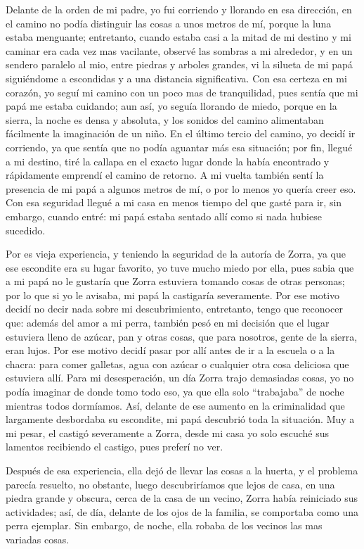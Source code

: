 Delante de la orden de mi padre, yo fui corriendo y llorando en esa dirección, en el camino no podía distinguir las cosas a unos metros de mí, porque la luna estaba menguante; entretanto, cuando estaba casi a la mitad de mi destino y mi caminar era cada vez mas vacilante, observé las sombras a mi alrededor, y en un sendero paralelo al mio, entre piedras y arboles grandes, vi la silueta de mi papá siguiéndome a escondidas y a una distancia significativa.
Con esa certeza en mi corazón, yo seguí mi camino con un poco mas de tranquilidad, pues sentía que mi papá me estaba cuidando; aun así, yo seguía llorando de miedo, porque en la sierra, la noche es densa y absoluta, y los sonidos del camino alimentaban fácilmente la imaginación de un niño.
En el último tercio del camino, yo decidí ir corriendo, ya que sentía que no podía aguantar más esa situación; por fin, llegué a mi destino, tiré la callapa en el exacto lugar donde la había encontrado y rápidamente emprendí el camino de retorno.
A mi vuelta también sentí la presencia de mi papá a algunos metros de mí, o por lo menos yo quería creer eso. Con esa seguridad llegué a mi casa en menos tiempo del que gasté para ir, sin embargo, cuando entré: mi papá estaba sentado allí como si nada hubiese sucedido.

Por es vieja experiencia, y teniendo la seguridad de la autoría de Zorra, ya que ese escondite era su lugar favorito, yo tuve mucho miedo por ella, pues sabia que a mi papá no le gustaría que Zorra estuviera tomando cosas de otras personas; por lo que si yo le avisaba, mi papá la castigaría severamente. Por ese motivo decidí no decir nada sobre mi descubrimiento, entretanto, tengo que reconocer que: además del amor a mi perra, también pesó en mi decisión que el lugar estuviera lleno de azúcar, pan y otras cosas, que para nosotros, gente de la sierra, eran lujos.
Por ese motivo decidí pasar por allí antes de ir a la escuela o a la chacra: para comer galletas, agua con azúcar o cualquier otra cosa deliciosa que estuviera allí.
Para mi desesperación, un día Zorra trajo demasiadas cosas, yo no podía imaginar de donde tomo todo eso, ya que ella solo ``trabajaba'' de noche mientras todos dormíamos. Así, delante de ese aumento en la criminalidad que largamente desbordaba su escondite, mi papá descubrió toda la situación.
Muy a mi pesar, el castigó severamente a Zorra, desde mi casa yo solo escuché sus lamentos recibiendo el castigo, pues preferí no ver.


Después de esa experiencia, ella dejó de llevar las cosas a la huerta, y el problema parecía resuelto, no obstante, luego descubriríamos que lejos de casa, en una piedra grande y obscura, cerca de la casa de un vecino, 
Zorra había reiniciado sus actividades; así, de día, delante de los ojos de la familia, se comportaba como una perra ejemplar. Sin embargo, de noche, ella robaba de los vecinos las mas variadas cosas.

